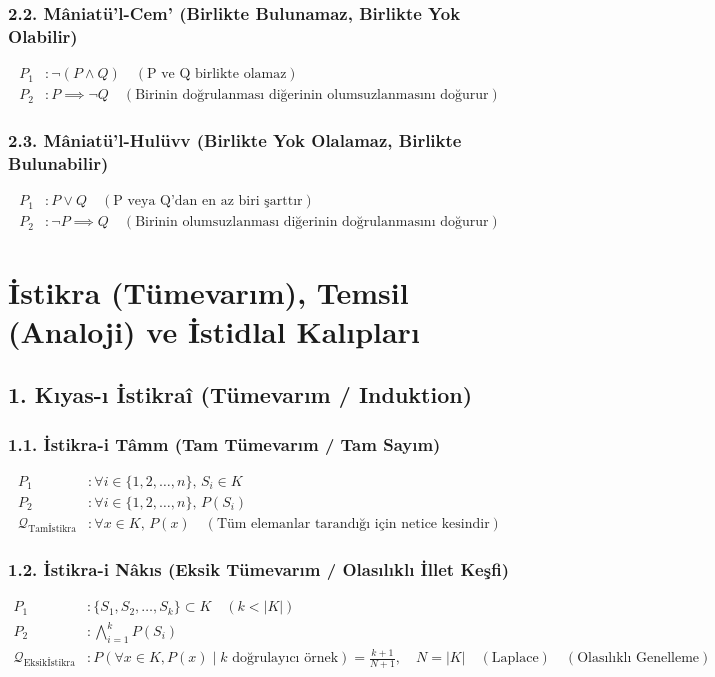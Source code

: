 \documentclass[11pt, a4paper]{article}
\begin{document}
\subsubsection{2.2. Mâniatü'l-Cem' (Birlikte Bulunamaz, Birlikte Yok Olabilir)}
\begin{align}
P_1 &: \neg (P \land Q) \quad (\text{P ve Q birlikte olamaz}) \\
P_2 &: P \implies \neg Q \quad (\text{Birinin doğrulanması diğerinin olumsuzlanmasını doğurur})
\end{align}

\subsubsection{2.3. Mâniatü'l-Hulüvv (Birlikte Yok Olalamaz, Birlikte Bulunabilir)}
\begin{align}
P_1 &: P \lor Q \quad (\text{P veya Q'dan en az biri şarttır}) \\
P_2 &: \neg P \implies Q \quad (\text{Birinin olumsuzlanması diğerinin doğrulanmasını doğurur})
\end{align}

\section{İstikra (Tümevarım), Temsil (Analoji) ve İstidlal Kalıpları}

\subsection{1. Kıyas-ı İstikraî (Tümevarım / Induktion)}

\subsubsection{1.1. İstikra-i Tâmm (Tam Tümevarım / Tam Sayım)}
\begin{align}
P_1 &: \forall i \in \{1, 2, \dots, n\}, \, S_i \in K \\
P_2 &: \forall i \in \{1, 2, \dots, n\}, \, P(S_i) \\
\mathcal{Q}_{\text{Tamİstikra}} &: \forall x \in K, \, P(x) \quad (\text{Tüm elemanlar tarandığı için netice kesindir})
\end{align}

\subsubsection{1.2. İstikra-i Nâkıs (Eksik Tümevarım / Olasılıklı İllet Keşfi)}
\begin{align}
P_1 &: \{S_1, S_2, \dots, S_k\} \subset K \quad (k < |K|) \\
P_2 &: \bigwedge_{i=1}^k P(S_i) \\
\mathcal{Q}_{\text{Eksikİstikra}} &: P\left( \forall x \in K, P(x) \mid k \text{ doğrulayıcı örnek} \right) = \frac{k+1}{N+1}, \quad N = |K| \quad (\text{Laplace}) \quad (\text{Olasılıklı Genelleme})
\end{align}
\end{document}
